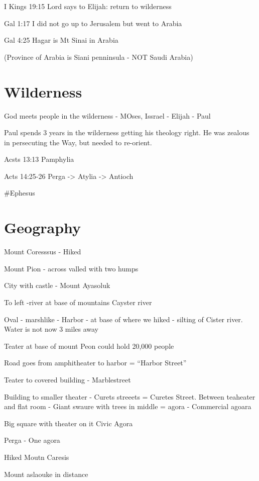 \documentclass[
]{book}
\begin{document}
I Kings 19:15 Lord says to Elijah: return to wilderness

Gal 1:17 I did not go up to Jerusalem but went to Arabia

Gal 4:25 Hagar is Mt Sinai in Arabia

(Province of Arabia is Siani penninsula - NOT Saudi Arabia)

\hypertarget{wilderness}{%
\section{Wilderness}\label{wilderness}}

God meets people in the wilderness - MOses, Issrael - Elijah - Paul

Paul spends 3 years in the wilderness getting his theology right. He was zealous in persecuting the Way, but needed to re-orient.

Acsts 13:13 Pamphylia

Acts 14:25-26 Perga -\textgreater{} Atylia -\textgreater{} Antioch

\#Ephesus

\hypertarget{geography}{%
\section{Geography}\label{geography}}

Mount Coresssus - Hiked

Mount Pion - across valled with two humps

City with castle - Mount Ayasoluk

To left -river at base of mountains Cayster river

Oval - marshlike - Harbor - at base of where we hiked - silting of Cister river. Water is not now 3 miles away

Teater at base of mount Peon could hold 20,000 people

Road goes from amphitheater to harbor = ``Harbor Street''

Teater to covered building - Marblestreet

Building to smaller theater - Curets streeets = Curetes Street. Between teaheater and flat room - Giant swaure with trees in middle = agora - Commercial agoara

Big square with theater on it Civic Agora

Perga - One agora

Hiked Moutn Caresis

Mount aslaouke in distance
\end{document}
